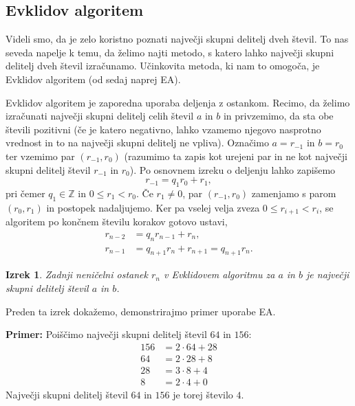 \documentclass[12pt, a4paper]{article}
\newtheorem{izr}{Izrek}
\newenvironment{prim}[1][]{\par\medskip\noindent \textbf{Primer: }}{\medskip}
\begin{document}
\subsection{Evklidov algoritem}

Videli smo, da je zelo koristno poznati največji skupni delitelj dveh števil. To nas seveda napelje k temu, da želimo najti metodo, s katero lahko največji skupni delitelj dveh števil izračunamo. Učinkovita metoda, ki nam to omogoča, je Evklidov algoritem (od sedaj naprej EA).

Evklidov algoritem je zaporedna uporaba deljenja z ostankom. Recimo, da želimo izračunati največji skupni delitelj celih števil $a$ in $b$ in privzemimo, da sta obe števili pozitivni (če je katero negativno, lahko vzamemo njegovo nasprotno vrednost in to na največji skupni delitelj ne vpliva). Označimo $a=r_{-1}$ in $b=r_0$ ter vzemimo par $(r_{-1}, r_0)$ (razumimo ta zapis kot urejeni par in ne kot največji skupni delitelj števil $r_{-1}$ in $r_0$). Po osnovnem izreku o deljenju lahko zapišemo
$$r_{-1} = q_1 r_0 + r_1,$$
pri čemer $q_1\in \mathbb{Z}$ in $0\leq r_1 < r_0$. Če $r_1 \neq 0$, par $(r_{-1}, r_0)$ zamenjamo s parom $(r_0, r_1)$ in postopek nadaljujemo. Ker pa vselej velja zveza $0\leq r_{i+1} < r_i$, se algoritem po končnem številu korakov gotovo ustavi,
\begin{align*}
r_{n-2} &= q_n r_{n-1} + r_n, \\
r_{n-1} &= q_{n+1} r_n + r_{n+1}=  q_{n+1} r_n.
\end{align*}

\begin{izr}
Zadnji neničelni ostanek $r_n$ v Evklidovem algoritmu za $a$ in $b$ je največji skupni delitelj števil $a$ in $b$.
\end{izr}

Preden ta izrek dokažemo, demonstrirajmo primer uporabe EA.

\begin{prim}
Poiščimo največji skupni delitelj števil $64$ in $156$:
\begin{align*}
156 &= 2\cdot 64 + 28 \\
64 &= 2\cdot 28 + 8 \\
28 &= 3\cdot 8 + 4 \\
8 &= 2\cdot 4 + 0
\end{align*} 
Največji skupni delitelj števil $64$ in $156$ je torej število $4$.
\end{prim}
\end{document}
